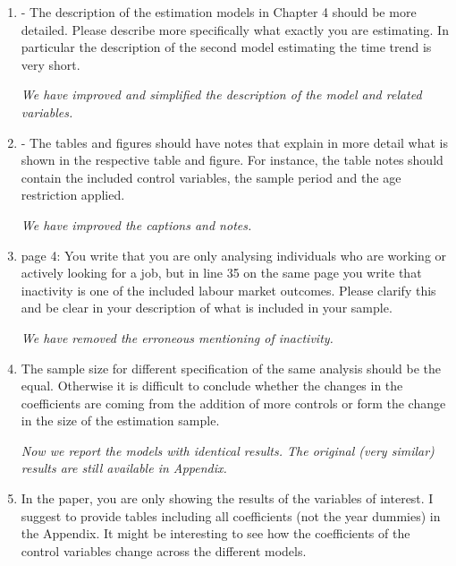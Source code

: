 \documentclass{article}
\newenvironment{response}
{\slshape}{}
\begin{document}
\begin{enumerate}
\item- The description of the estimation models in Chapter 4 should
  be more detailed. Please describe more specifically what exactly you
  are estimating. In particular the description of the second model
  estimating the time trend is very short.

  \begin{response}
    We have improved and simplified the description of the model and related variables.
  \end{response}
\item - The tables and figures should have notes that explain in more
  detail what is shown in the respective table and figure. For
  instance, the table notes should contain the included control
  variables, the sample period and the age restriction applied.

  \begin{response}
    We have improved the captions and notes.
  \end{response}

\item page 4: You write that you are only analysing individuals who are
working or actively looking for a job, but in line 35 on the same page
you write that inactivity is one of the included labour market
outcomes. Please clarify this and be clear in your description of what
is included in your sample.

\begin{response}
  We have removed the erroneous mentioning of inactivity. 
\end{response}
\item  The sample size for different specification of the same analysis
  should be the equal. Otherwise it is difficult to conclude whether the
  changes in the coefficients are coming from the addition of more
  controls or form the change in the size of the estimation sample.

  \begin{response}
    Now we report the models with identical results.  The original
    (very similar)
    results are still available in Appendix.
  \end{response}

\item In the paper, you are only showing the results of the variables of
  interest. I suggest to provide tables including all coefficients (not
  the year dummies) in the Appendix. It might be interesting to see how
  the coefficients of the control variables change across the different
  models.


\end{enumerate}
\end{document}
